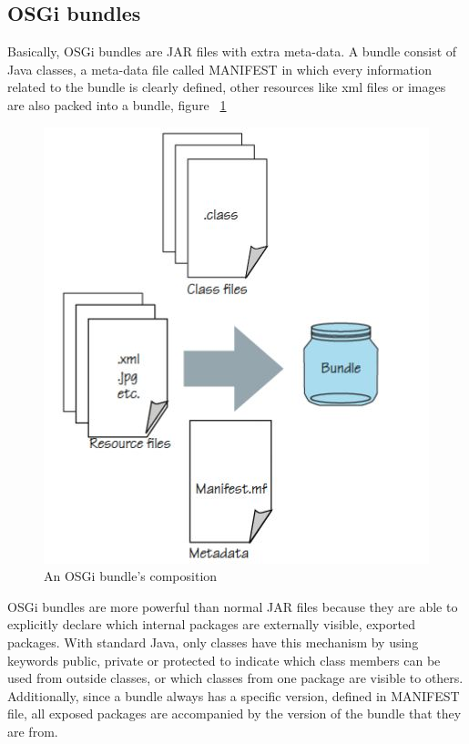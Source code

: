 \subsection{OSGi bundles}
Basically, OSGi bundles are JAR files with extra meta-data. A bundle consist of Java classes, a meta-data file called MANIFEST in which every information related to the bundle is clearly defined, other resources like xml files or images are also packed into a bundle, figure ~\ref{fig:bundle}
\begin{figure}
	\centering
		\includegraphics{image/bundle.JPG}
	\caption{An OSGi bundle's composition}
	\label{fig:bundle}
\end{figure}

OSGi bundles are more powerful than normal JAR files because they are able to explicitly declare which internal packages are externally visible, exported packages. With standard Java, only classes have this mechanism by using keywords public, private or protected to indicate which class members can be used from outside classes, or which classes from one package are visible to others. Additionally, since a bundle always has a specific version, defined in MANIFEST file, all exposed packages are accompanied by the version of the bundle that they are from.

